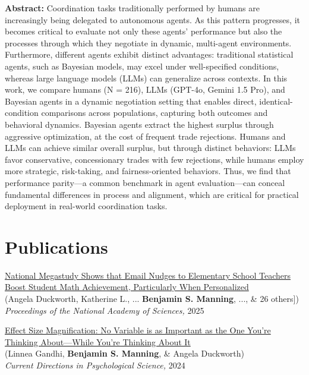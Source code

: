 \documentclass[margin,line,pifont,palatino,courier, 9pt]{res}
\begin{document}
\begin{resume}
\begin{singlespace}
\footnotesize
\textbf{Abstract: }Coordination tasks traditionally performed by humans are increasingly being delegated to autonomous agents. As this pattern progresses, it becomes critical to evaluate not only these agents' performance but also the processes through which they negotiate in dynamic, multi-agent environments. Furthermore, different agents exhibit distinct advantages: traditional statistical agents, such as Bayesian models, may excel under well-specified conditions, whereas large language models (LLMs) can generalize across contexts. In this work, we compare humans (N = 216), LLMs (GPT-4o, Gemini 1.5 Pro), and Bayesian agents in a dynamic negotiation setting that enables direct, identical-condition comparisons across populations, capturing both outcomes and behavioral dynamics. Bayesian agents extract the highest surplus through aggressive optimization, at the cost of frequent trade rejections. Humans and LLMs can achieve similar overall surplus, but through distinct behaviors: LLMs favor conservative, concessionary trades with few rejections, while humans employ more strategic, risk-taking, and fairness-oriented behaviors. Thus, we find that performance parity---a common benchmark in agent evaluation---can conceal fundamental differences in process and alignment, which are critical for practical deployment in real-world coordination tasks.
\end{singlespace}


\section{\sc Publications}
\href{https://www.pnas.org/doi/10.1073/pnas.2418616122}{National Megastudy Shows that Email Nudges to Elementary School Teachers Boost Student Math Achievement, Particularly When Personalized}\\
(Angela Duckworth\footnotemark[\value{footnote}], Katherine L., ... \textbf{Benjamin S. Manning}, ..., \& 26 others])\\
\textit{Proceedings of the National Academy of Sciences,} 2025

\href{https://journals.sagepub.com/doi/full/10.1177/09637214241268222}{Effect Size Magnification: No Variable is as Important as the One You're Thinking About---While You're Thinking About It}\\
(Linnea Gandhi\footnotemark[\value{footnote}], \textbf{Benjamin S. Manning}, \& Angela Duckworth)\\
\textit{Current Directions in Psychological Science,} 2024


\end{resume}
\end{document}
